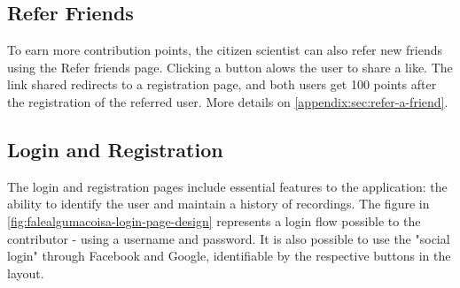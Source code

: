 \subsection{Refer Friends}

To earn more contribution points, the citizen scientist can also refer new friends using the Refer friends page. Clicking a button alows the user to share a like. The link shared redirects to a registration page, and both users get 100 points after the registration of the referred user. More details on \ref{appendix:sec:refer-a-friend}.

\subsection{Login and Registration}

The login and registration pages include essential features to the application: the ability to identify the user and maintain a history of recordings. The figure in \ref{fig:falealgumacoisa-login-page-design} represents a login flow possible to the contributor - using a username and password. It is also possible to use the "social login" through Facebook and Google, identifiable by the respective buttons in the layout.

